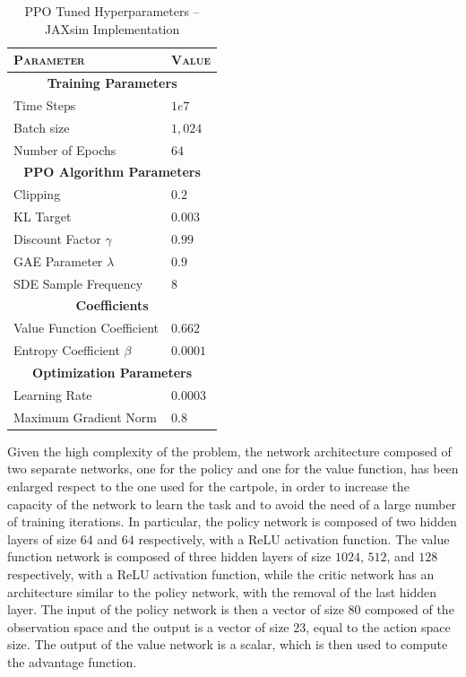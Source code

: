 \begin{table}[h]
    \centering
    \begin{tabular}{ll}
        \toprule
        \textsc{Parameter}          & \textsc{Value}          \\
        \midrule
        \multicolumn{2}{c}{\textbf{Training Parameters}}      \\
        Time Steps                  & $1e7$                   \\
        Batch size                  & $1,024$                 \\
        Number of Epochs            & $64$                    \\
        \midrule
        \multicolumn{2}{c}{\textbf{PPO Algorithm Parameters}} \\
        Clipping                    & $0.2$                   \\
        KL Target                   & $0.003$                 \\
        Discount Factor $\gamma$    & $0.99$                  \\
        GAE Parameter $\lambda$     & $0.9$                   \\
        SDE Sample Frequency        & $8$                     \\
        \midrule
        \multicolumn{2}{c}{\textbf{Coefficients}}             \\
        Value Function Coefficient  & $0.662$                 \\
        Entropy Coefficient $\beta$ & $0.0001$                \\
        \midrule
        \multicolumn{2}{c}{\textbf{Optimization Parameters}}  \\
        Learning Rate               & $0.0003$                \\
        Maximum Gradient Norm       & $0.8$                   \\
        \bottomrule
    \end{tabular}
    \caption{PPO Tuned Hyperparameters -- JAXsim Implementation}
    \label{tab:ppohyperparameters_jaxsim}
\end{table}

Given the high complexity of the problem, the network architecture composed of two separate networks, one for the policy and one for the value function, has been enlarged respect to the one used for the cartpole, in order to increase the capacity of the network to learn the task and to avoid the need of a large number of training iterations. In particular, the policy network is composed of two hidden layers of size $64$ and $64$ respectively, with a \ac{ReLU} activation function. The value function network is composed of three hidden layers of size $1024$, $512$, and $128$ respectively, with a \ac{ReLU} activation function, while the critic network has an architecture similar to the policy network, with the removal of the last hidden layer. The input of the policy network is then a vector of size $80$ composed of the observation space and the output is a vector of size $23$, equal to the action space size.
The output of the value network is a scalar, which is then used to compute the advantage function.


